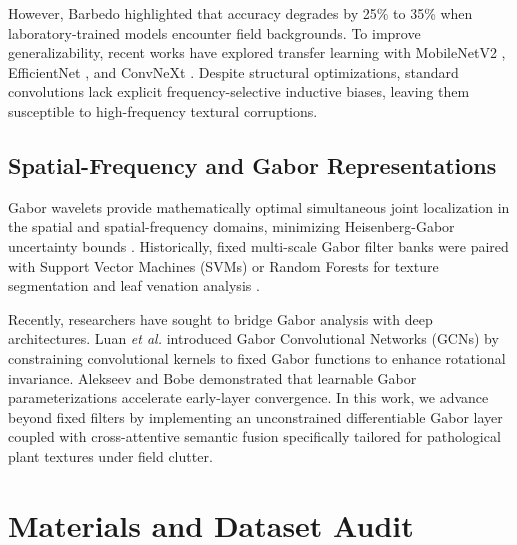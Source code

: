 \documentclass[journal]{IEEEtran}
\begin{document}
However, Barbedo \cite{barbedo2019plant} highlighted that accuracy degrades by 25\% to 35\% when laboratory-trained models encounter field backgrounds. To improve generalizability, recent works have explored transfer learning with MobileNetV2 \cite{sandler2018mobilenetv2}, EfficientNet \cite{tan2019efficientnet}, and ConvNeXt \cite{liu2022convnet}. Despite structural optimizations, standard convolutions lack explicit frequency-selective inductive biases, leaving them susceptible to high-frequency textural corruptions.

\subsection{Spatial-Frequency and Gabor Representations}
Gabor wavelets provide mathematically optimal simultaneous joint localization in the spatial and spatial-frequency domains, minimizing Heisenberg-Gabor uncertainty bounds \cite{daugman1985uncertainty}. Historically, fixed multi-scale Gabor filter banks were paired with Support Vector Machines (SVMs) or Random Forests for texture segmentation and leaf venation analysis \cite{manjunath1996texture, kamencay2020improved}.

Recently, researchers have sought to bridge Gabor analysis with deep architectures. Luan \textit{et al.} \cite{luan2018gabor} introduced Gabor Convolutional Networks (GCNs) by constraining convolutional kernels to fixed Gabor functions to enhance rotational invariance. Alekseev and Bobe \cite{alekseev2019gabor} demonstrated that learnable Gabor parameterizations accelerate early-layer convergence. In this work, we advance beyond fixed filters by implementing an unconstrained differentiable Gabor layer coupled with cross-attentive semantic fusion specifically tailored for pathological plant textures under field clutter.

\section{Materials and Dataset Audit}
\end{document}
